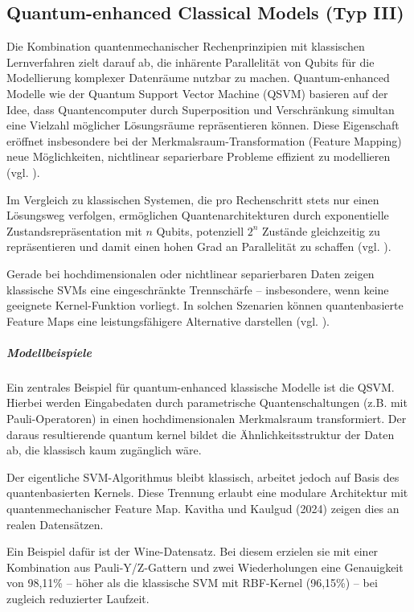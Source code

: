 \subsection{Quantum-enhanced Classical Models (Typ III)}
Die Kombination quantenmechanischer Rechenprinzipien mit klassischen Lernverfahren zielt darauf ab, die inhärente Parallelität von Qubits für die Modellierung komplexer Datenräume nutzbar zu machen. Quantum-enhanced Modelle wie der Quantum Support Vector Machine (QSVM) basieren auf der Idee, dass Quantencomputer durch Superposition und Verschränkung simultan eine Vielzahl möglicher Lösungsräume repräsentieren können. Diese Eigenschaft eröffnet insbesondere bei der Merkmalsraum-Transformation (Feature Mapping) neue Möglichkeiten, nichtlinear separierbare Probleme effizient zu modellieren (vgl. \cite{kavithaQuantumMachineLearning2024}).

Im Vergleich zu klassischen Systemen, die pro Rechenschritt stets nur einen Lösungsweg verfolgen, ermöglichen Quantenarchitekturen durch exponentielle Zustandsrepräsentation mit \( n \) Qubits, potenziell \( 2^n \) Zustände gleichzeitig zu repräsentieren und damit einen hohen Grad an Parallelität zu schaffen (vgl. \cite{gujjuQuantumMachineLearning2024}).

Gerade bei hochdimensionalen oder nichtlinear separierbaren Daten zeigen klassische SVMs eine eingeschränkte Trennschärfe – insbesondere, wenn keine geeignete Kernel-Funktion vorliegt. In solchen Szenarien können quantenbasierte Feature Maps eine leistungsfähigere Alternative 
darstellen (vgl. \cite{peral-garciaSystematicLiteratureReview2024}).


\subparagraph{Modellbeispiele}
Ein zentrales Beispiel für quantum-enhanced klassische Modelle ist die QSVM. Hierbei werden Eingabedaten durch parametrische Quantenschaltungen (z.B. mit Pauli-Operatoren) in einen hochdimensionalen Merkmalsraum transformiert. Der daraus resultierende quantum kernel bildet die Ähnlichkeitsstruktur der Daten ab, die klassisch kaum zugänglich wäre. 

Der eigentliche SVM-Algorithmus bleibt klassisch, arbeitet jedoch auf Basis des quantenbasierten Kernels. Diese Trennung erlaubt eine modulare Architektur mit quantenmechanischer Feature Map.
Kavitha und Kaulgud (2024) zeigen dies an realen Datensätzen.

Ein Beispiel dafür ist der Wine-Datensatz. Bei diesem erzielen sie mit einer Kombination aus Pauli-Y/Z-Gattern und zwei Wiederholungen eine Genauigkeit von 98{,}11\% – höher als die klassische SVM mit RBF-Kernel (96{,}15\%) – bei zugleich reduzierter Laufzeit.

